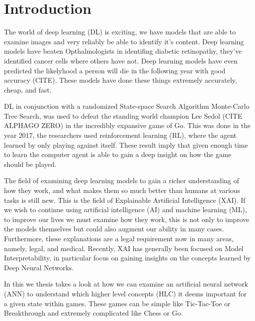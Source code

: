 \chapter{Introduction\label{cha:introduction}}


The world of deep learning (DL) is exciting, we have models that are able to examine
images and very reliably be able to identify it's content. Deep learning models have
beaten Opthalmologists in identifing diabetic retinopathy, they've identified
cancer cells where others have not. Deep learning models have even predicted
the likelyhood a person will die in the following year with good accuracy (CITE).
These models have done these things extremely accurately, cheap, and fast.

DL in conjunction with a randomized State-space Search Algorithm Monte-Carlo Tree Search, 
was used to defeat the standing world champion Lee Sedol (CITE ALPHAGO ZERO) in the incredibly expansive game of Go. This was done in the year 
2017, the researchers used reinforcement learning (RL), where the agent learned by only playing against itself. 
These result imply that given enough time to learn the computer agent is able to
gain a deep insight on how the game should be played.  

The field of examining deep learning models to gain a richer understanding
of how they work, and what makes them so much better than humans at various tasks
is still new. This is the field of Explainable Artificial Intelligence (XAI).
If we wish to continue using artificial intelligence (AI) and machine learning (ML),
to improve our lives we must examine how they work, this is not only to improve
the models themselves but could also augment our ability in many cases.
Furthermore, these explanations are a legal requirement now in many areas, namely, legal, and
medical. Recently, XAI has generally been focused on Model Interpretability, in
particular focus on gaining insights on the concepts learned by Deep Neural Networks.

In this we thesis takes a look at how we can examine an artificial neural network (ANN)
to understand which higher level concepts (HLC) it deems important for a given state
within games. These games can be simple like Tic-Tac-Toe or Breakthrough and extremely
complicated like Chess or Go. 

